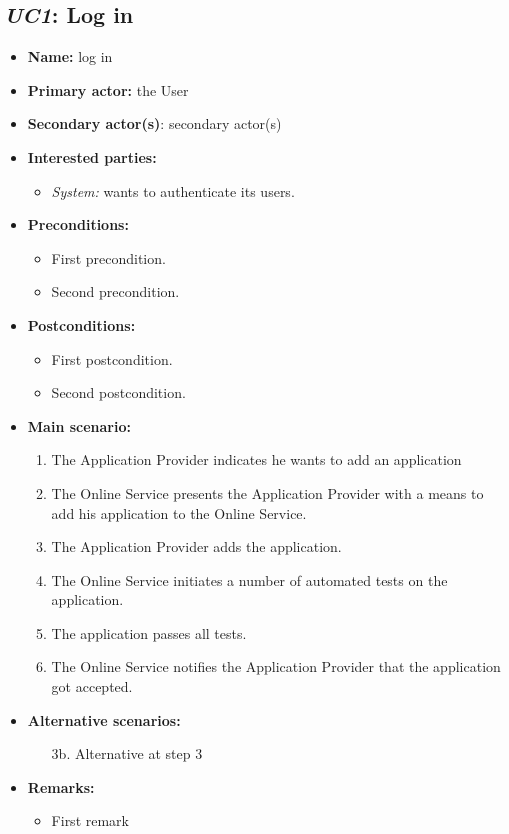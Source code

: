 \documentclass[english,peerreview]{sareport}
\begin{document}
\subsection{\emph{UC1}: Log in}
\begin{itemize}
    \item \textbf{Name:} log in
    \item \textbf{Primary actor:} the User
    \item \textbf{Secondary actor(s)}: secondary actor(s)
    \item \textbf{Interested parties:} 
        \begin{itemize}
            \item \textit{System:} wants to authenticate its users.
        \end{itemize}

    \item \textbf{Preconditions:}
        \begin{itemize}
            \item First precondition.
            \item Second precondition.
        \end{itemize}

    \item \textbf{Postconditions:}
        \begin{itemize}
            \item First postcondition.
            \item Second postcondition.
        \end{itemize}
        
    \item \textbf{Main scenario:} 
    \begin{enumerate}
       \item The Application Provider indicates he wants to add an application
       \item The Online Service presents the Application Provider with a means to add his application to the Online Service.
       \item The Application Provider adds the application.
	\item The Online Service initiates a number of automated tests on the application.
	\item The application passes all tests.
	\item The Online Service notifies the Application Provider that the application got accepted.
    \end{enumerate}

    \item \textbf{Alternative scenarios:} 
    \begin{enumerate}
        \item [3b.] Alternative at step 3
    \end{enumerate}
    
    \item \textbf{Remarks:}
        \begin{itemize}
            \item First remark
        \end{itemize}
\end{itemize}
\end{document}
